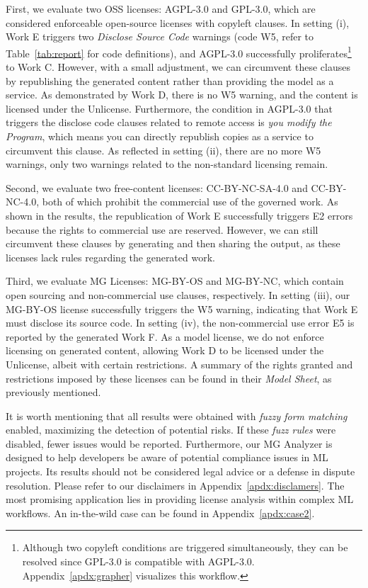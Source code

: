 First, we evaluate two OSS licenses: AGPL-3.0 and GPL-3.0, which are considered enforceable open-source licenses with copyleft clauses.
In setting (i), Work E triggers two \emph{Disclose Source Code} warnings (code W5, refer to Table~\ref{tab:report} for code definitions), and AGPL-3.0 successfully proliferates\footnote{Although two copyleft conditions are triggered simultaneously, they can be resolved since GPL-3.0 is compatible with AGPL-3.0. Appendix~\ref{apdx:grapher} visualizes this workflow.} to Work C.
However, with a small adjustment, we can circumvent these clauses by republishing the generated content rather than providing the model as a service. 
As demonstrated by Work D, there is no W5 warning, and the content is licensed under the Unlicense.
Furthermore, the condition in AGPL-3.0 that triggers the disclose code clauses related to remote access is \emph{you modify the Program}, which means you can directly republish copies as a service to circumvent this clause.
As reflected in setting (ii), there are no more W5 warnings, only two warnings related to the non-standard licensing remain.

Second, we evaluate two free-content licenses: CC-BY-NC-SA-4.0 and CC-BY-NC-4.0, both of which prohibit the commercial use of the governed work. 
As shown in the results, the republication of Work E successfully triggers E2 errors because the rights to commercial use are reserved. 
However, we can still circumvent these clauses by generating and then sharing the output, as these licenses lack rules regarding the generated work.

Third, we evaluate MG Licenses: MG-BY-OS and MG-BY-NC, which contain open sourcing and non-commercial use clauses, respectively.
In setting (iii), our MG-BY-OS license successfully triggers the W5 warning, indicating that Work E must disclose its source code.
In setting (iv), the non-commercial use error E5 is reported by the generated Work F.
As a model license, we do not enforce licensing on generated content, allowing Work D to be licensed under the Unlicense, albeit with certain restrictions.
A summary of the rights granted and restrictions imposed by these licenses can be found in their \emph{Model Sheet}, as previously mentioned.

It is worth mentioning that all results were obtained with \emph{fuzzy form matching} enabled, maximizing the detection of potential risks.
If these \emph{fuzz rules} were disabled, fewer issues would be reported. 
Furthermore, our MG Analyzer is designed to help developers be aware of potential compliance issues in ML projects. 
Its results should not be considered legal advice or a defense in dispute resolution. Please refer to our disclaimers in Appendix~\ref{apdx:disclamers}.
The most promising application lies in providing license analysis within complex ML workflows. An in-the-wild case can be found in Appendix~\ref{apdx:case2}.

